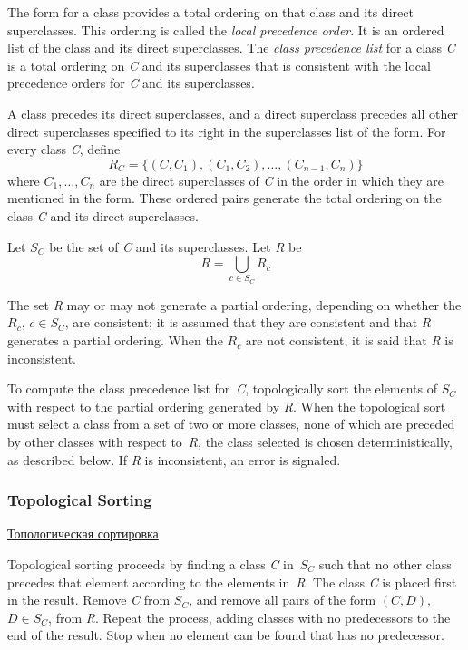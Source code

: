 The  form for a class provides a total ordering on that
class and its direct superclasses.  This ordering is called the \emph{local
  precedence order}.  It is an ordered list of the class and its 
direct superclasses. The \emph{class precedence list} for a
class \emph{C} is a total ordering on \emph{C} and its superclasses that is consistent
with the local precedence orders for \emph{C} and its superclasses.

A class precedes its direct superclasses, and a
direct superclass precedes all other direct superclasses specified to
its right in the superclasses list of the  form.  For
every class \emph{C}, define
$$R_C=\{(C,C_1),(C_1,C_2),\ldots,(C_{n-1},C_{n})\}$$
where $C_1,\ldots,C_{n}$ are
the direct superclasses of \emph{C} in the order in which
they are mentioned in the  form. These ordered pairs
generate the total ordering on the class \emph{C} and its direct
superclasses.

Let $S_C$ be the set of \emph{C} and its superclasses. Let \emph{R} be
$$R=\bigcup_{\textstyle c\in {S_{C}}} R_{c}$$

The set \emph{R} may or may not generate a partial ordering, depending on
whether the $R_{c}$, $c\in S_{C}$,
are consistent; it is assumed
that they are consistent and that \emph{R} generates a partial ordering.
When the $R_{c}$ are not consistent, it is said that \emph{R} is inconsistent.

To compute the class precedence list for~\emph{C},
topologically sort the elements of $S_{C}$ with respect to the
partial ordering generated by \emph{R}.  When the topological
sort must select a class from a set of two or more classes, none of
which are preceded by other classes with respect to~\emph{R},
the class selected is chosen deterministically, as described below.
If \emph{R} is inconsistent, an error is signaled.

\subsubsection{Topological Sorting}

\href{http://ru.wikipedia.org/wiki/Топологическая_сортировка}{Топологическая
  сортировка}

Topological sorting proceeds by finding a class \emph{C} in~$S_{C}$ such
that no other class precedes that element according to the elements
in~\emph{R}.  The class \emph{C} is placed first in the result.
Remove \emph{C} from $S_{C}$, and remove all pairs of the form
$(C,D)$,
$D\in S_{C}$, from \emph{R}. Repeat the process, adding
classes with no predecessors to the end of the result. Stop when no
element can be found that has no predecessor.

